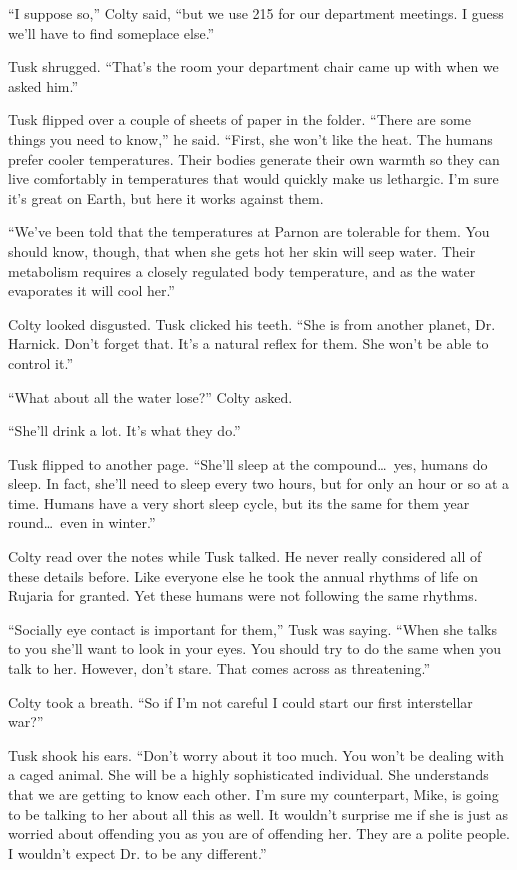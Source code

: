 ``I suppose so,'' Colty said, ``but we use 215 for our department meetings. I guess we'll have
to find someplace else.''

Tusk shrugged. ``That's the room your department chair came up with when we asked him.''

Tusk flipped over a couple of sheets of paper in the folder. ``There are some things you need to
know,'' he said. ``First, she won't like the heat. The humans prefer cooler temperatures. Their
bodies generate their own warmth so they can live comfortably in temperatures that would quickly
make us lethargic. I'm sure it's great on Earth, but here it works against them.

``We've been told that the temperatures at Parnon are tolerable for them. You should know,
though, that when she gets hot her skin will seep water. Their metabolism requires a closely
regulated body temperature, and as the water evaporates it will cool her.''

Colty looked disgusted. Tusk clicked his teeth. ``She is from another planet, Dr. Harnick. Don't
forget that. It's a natural reflex for them. She won't be able to control it.''

``What about all the water lose?'' Colty asked.

``She'll drink a lot. It's what they do.''

Tusk flipped to another page. ``She'll sleep at the compound\ldots\ yes, humans do sleep. In
fact, she'll need to sleep every two hours, but for only an hour or so at a time. Humans have a
very short sleep cycle, but its the same for them year round\ldots\ even in winter.''

Colty read over the notes while Tusk talked. He never really considered all of these details
before. Like everyone else he took the annual rhythms of life on Rujaria for granted. Yet these
humans were not following the same rhythms.

``Socially eye contact is important for them,'' Tusk was saying. ``When she talks to you she'll
want to look in your eyes. You should try to do the same when you talk to her. However, don't
stare. That comes across as threatening.''

Colty took a breath. ``So if I'm not careful I could start our first interstellar war?''

Tusk shook his ears. ``Don't worry about it too much. You won't be dealing with a caged animal.
She will be a highly sophisticated individual. She understands that we are getting to know each
other. I'm sure my counterpart, Mike, is going to be talking to her about all this as well. It
wouldn't surprise me if she is just as worried about offending you as you are of offending her.
They are a polite people. I wouldn't expect Dr.  to be any different.''

